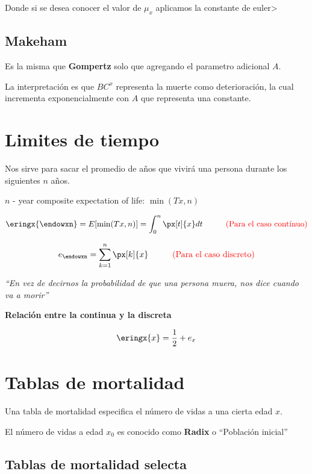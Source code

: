 \documentclass[12pt, a4paper, footinclude=true]{scrbook}
\begin{document}
Donde si se desea conocer el valor de $\mu_x$ aplicamos la constante de euler> 

\subsection{Makeham}

Es la misma que \textbf{Gompertz} solo que agregando el parametro adicional $A$. 

La interpretación es que $BC^x$ representa la muerte como deterioración, la cual incrementa exponencialmente con $A$ que representa una constante. 

\section{Limites de tiempo}

Nos sirve para sacar el promedio de años que vivirá una persona durante los siguientes $n$ años. 


$n$ - year composite expectation of life: 
$\min(Tx, n)$

$$\eringx{\endowxn} = E[\min(Tx, n)] = \int_{0}^{n} \px[t]{x} dt \hspace{1cm}\text{\color{red} (Para el caso contínuo)}$$ 

$$e_{\endowxn} = \sum_{k=1}^{n} \px[k]{x} \hspace{1cm} \text{\color{red} (Para el caso discreto)}$$

\begin{center}
	\textit{``En vez de decirnos la probabilidad de que una persona muera, nos dice cuando va a morir''}
\end{center}

\textbf{Relación entre la continua y la discreta}

$$\eringx{x} = \frac{1}{2} + e_x$$

\section{Tablas de mortalidad}

Una tabla de mortalidad especifica el número de vidas a una cierta edad $x$. 

El número de vidas a edad $x_0$ es conocido como \textbf{Radix} o ``Población inicial'' 

\subsection{Tablas de mortalidad selecta}
\end{document}
